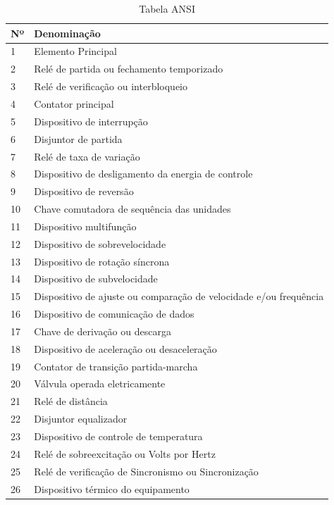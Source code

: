 \documentclass[a5paper,english,spanish,brazil]{ufsc-thesis}
\begin{document}
		\begin{longtable}{|l|p{}|}
		\caption{Tabela ANSI}
		 \\ \hline
		  Nº & Denominação \\ \hline
		  1 & Elemento Principal \\ \hline
		  2 & Relé de partida ou fechamento temporizado \\ \hline
		  3 & Relé de verificação ou interbloqueio \\ \hline
		  4 & Contator principal \\ \hline
		  5 & Dispositivo de interrupção \\ \hline
		  6 & Disjuntor de partida \\ \hline
		  7 & Relé de taxa de variação \\ \hline
		  8 & Dispositivo de desligamento da energia de controle \\ \hline
		  9 & Dispositivo de reversão \\ \hline
		  10 & Chave comutadora de sequência das unidades \\ \hline
		  11 & Dispositivo multifunção \\ \hline
		  12 & Dispositivo de sobrevelocidade \\ \hline
		  13 & Dispositivo de rotação síncrona \\ \hline
		  14 & Dispositivo de subvelocidade \\ \hline
		  15 & Dispositivo de ajuste ou comparação de velocidade e/ou frequência \\ \hline
		  16 & Dispositivo de comunicação de dados \\ \hline
		  17 & Chave de derivação ou descarga \\ \hline
		  18 & Dispositivo de aceleração ou desaceleração \\ \hline
		  19 & Contator de transição partida-marcha \\ \hline
		  20 & Válvula operada eletricamente \\ \hline
		  21 & Relé de distância \\ \hline
		  22 & Disjuntor equalizador \\ \hline
		  23 & Dispositivo de controle de temperatura \\ \hline
		  24 & Relé de sobreexcitação ou Volts por Hertz \\ \hline
		  25 & Relé de verificação de Sincronismo ou Sincronização \\ \hline
		  26 & Dispositivo térmico do equipamento \\ \hline

\end{longtable}
\end{document}
